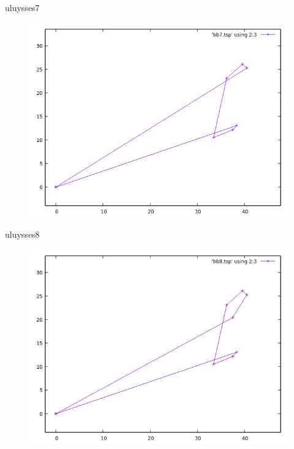 \documentclass{beamer}
\begin{document}
\begin{frame}[fragile]{uluysses7}
\begin{figure}[H]
\centering
\includegraphics[scale=0.5]{bb7.png}
\end{figure}
\end{frame}

\begin{frame}[fragile]{uluysses8}
\begin{figure}[H]
\centering
\includegraphics[scale=0.5]{bb8.png}
\end{figure}
\end{frame}
\end{document}
